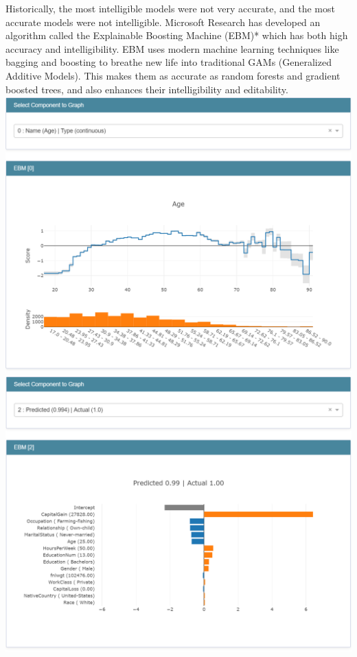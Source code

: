 \documentclass[twoside,11pt]{article}
\begin{document}
Historically, the most intelligible models were not very accurate, and the most accurate models were not intelligible. Microsoft Research has developed an algorithm called the Explainable Boosting Machine (EBM)* which has both high accuracy and intelligibility. EBM uses modern machine learning techniques like bagging and boosting to breathe new life into traditional GAMs (Generalized Additive Models). This makes them as accurate as random forests and gradient boosted trees, and also enhances their intelligibility and editability.
\vskip 0.1in
\includegraphics[scale=0.24]{images/ebm_global_age.PNG}
\includegraphics[scale=0.24]{images/ebm_local.PNG}
\end{document}

